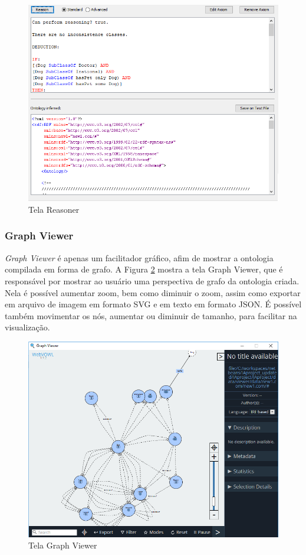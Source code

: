 \documentclass{bcc}
\begin{document}
\begin{figure}[H]
\centering
\includegraphics[width=.7\textwidth]{Figuras/tela_reasoner.png}
\caption{Tela Reasoner}
\label{fig:telaReasoner}
\end{figure}

\subsubsection{Graph Viewer}

\textit{Graph Viewer} é apenas um facilitador gráfico, afim de mostrar a ontologia compilada em forma de grafo. A Figura \ref{fig:telGraph}
mostra a tela Graph Viewer, que é responsável por mostrar ao usuário uma perspectiva de grafo da ontologia criada. Nela é possível aumentar zoom, bem como diminuir o zoom, assim como exportar em arquivo de imagem em formato SVG e em texto em formato JSON. É possível também movimentar os nós, aumentar ou diminuir de tamanho, para facilitar na visualização.

\begin{figure}[H]
\centering
\includegraphics[width=.7\textwidth]{Figuras/tela_graph.png}
\caption{Tela Graph Viewer}
\label{fig:telGraph}
\end{figure}
\end{document}

